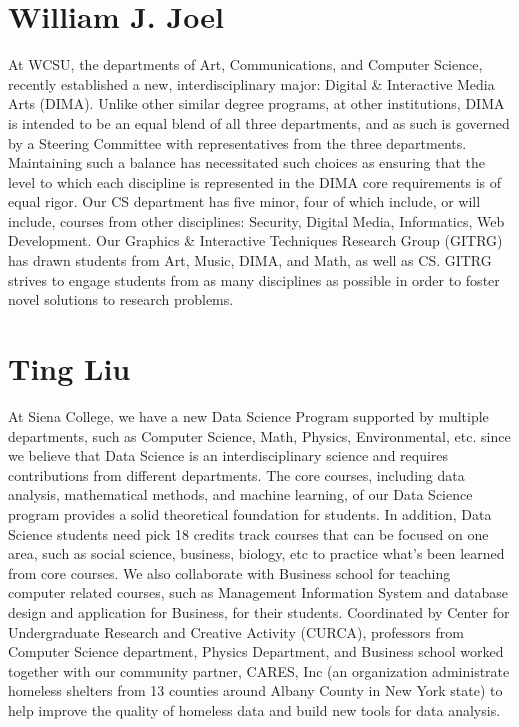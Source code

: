 \documentclass{article}
\begin{document}
\section{William J. Joel}
At WCSU, the departments of Art, Communications, and Computer Science, recently established a new, interdisciplinary major: Digital \& Interactive Media Arts (DIMA). Unlike other similar degree programs, at other institutions, DIMA is intended to be an equal blend of all three departments, and as such is governed by a Steering Committee with representatives from the three departments. Maintaining such a balance has necessitated such choices as ensuring that the level to which each discipline is represented in the DIMA core requirements is of equal rigor.
Our CS department has five minor, four of which include, or will include, courses from other disciplines: Security, Digital Media, Informatics, Web Development.
Our Graphics \& Interactive Techniques Research Group (GITRG) has drawn students from Art, Music, DIMA, and Math, as well as CS. GITRG strives to engage students from as many disciplines as possible in order to foster novel solutions to research problems.

\section{Ting Liu}
At Siena College, we have a new Data Science Program supported by multiple departments, such as Computer Science, Math, Physics, Environmental, etc. since we believe that Data Science is an interdisciplinary science and requires contributions from different departments. The core courses, including data analysis, mathematical methods, and machine learning, of our Data Science program provides a solid theoretical foundation for students. In addition, Data Science students need pick 18 credits track courses that can be focused on one area, such as social science, business, biology, etc to practice what's been learned from core courses.
We also collaborate with Business school for teaching computer related courses, such as Management Information System and database design and application for Business, for their students.
Coordinated by Center for Undergraduate Research and Creative Activity (CURCA), professors from Computer Science department, Physics Department, and Business school worked together with our community partner, CARES, Inc (an organization administrate homeless shelters from 13 counties around Albany County in New York state) to help improve the quality of homeless data and build new tools for data analysis.
\end{document}
